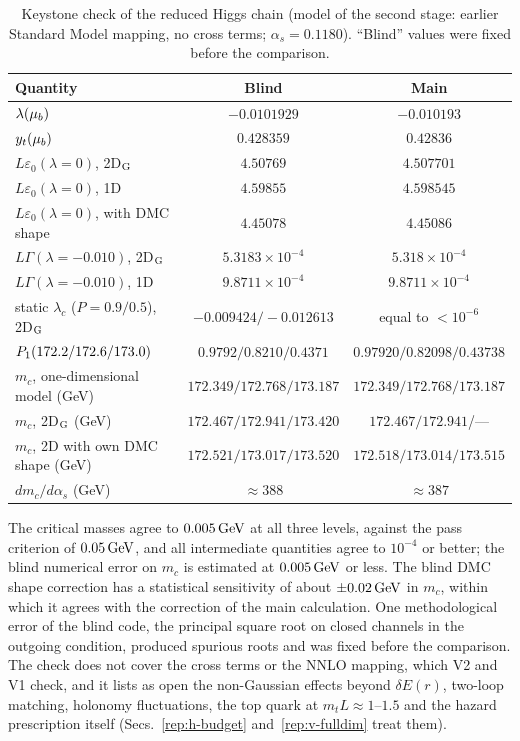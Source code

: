 \begin{table}[t]
\centering
\caption{Keystone check of the reduced Higgs chain (model of the second stage: earlier Standard Model mapping, no cross terms; $\alpha_s=0.1180$). ``Blind'' values were fixed before the comparison.}
\label{tab:v19-keystone}
\small
\begin{tabular}{@{}lcc@{}}
\toprule
Quantity & Blind & Main \\
\midrule
$\lambda(\mu_b)$ & $-0.0101929$ & $-0.010193$ \\ %
$y_t(\mu_b)$ & $0.428359$ & $0.42836$ \\ %
$L\varepsilon_0(\lambda=0)$, 2D$_{\rm G}$ & $4.50769$ & $4.507701$ \\ %
$L\varepsilon_0(\lambda=0)$, 1D & $4.59855$ & $4.598545$ \\ %
$L\varepsilon_0(\lambda=0)$, with DMC shape & $4.45078$ & $4.45086$ \\ %
$L\Gamma(\lambda=-0.010)$, 2D$_{\rm G}$ & $5.3183\times10^{-4}$ & $5.318\times10^{-4}$ \\ %
$L\Gamma(\lambda=-0.010)$, 1D & $9.8711\times10^{-4}$ & $9.8711\times10^{-4}$ \\ %
static $\lambda_c$ ($P=0.9/\allowbreak 0.5$), 2D$_{\rm G}$ & $-0.009424/\allowbreak{-}0.012613$ & equal to $<10^{-6}$ \\ %
$P_1(172.2/\allowbreak 172.6/\allowbreak 173.0)$ & $0.9792/\allowbreak 0.8210/\allowbreak 0.4371$ & $0.97920/\allowbreak 0.82098/\allowbreak 0.43738$ \\ %
$m_c$, one-dimensional model (GeV) & $172.349/\allowbreak 172.768/\allowbreak 173.187$ & $172.349/\allowbreak 172.768/\allowbreak 173.187$ \\ %
$m_c$, 2D$_{\rm G}$ (GeV) & $172.467/\allowbreak 172.941/\allowbreak 173.420$ & $172.467/\allowbreak 172.941$/--- \\ %
$m_c$, 2D with own DMC shape (GeV) & $172.521/\allowbreak 173.017/\allowbreak 173.520$ & $172.518/\allowbreak 173.014/\allowbreak 173.515$ \\ %
$dm_c/d\alpha_s$ (GeV) & $\approx388$ & $\approx387$ \\ %
\bottomrule
\end{tabular}
\end{table}

The critical masses agree to $0.005\,\mathrm{GeV}$ at all three levels, against the pass criterion of $0.05\,\mathrm{GeV}$, and all intermediate quantities agree to $10^{-4}$ or better; the blind numerical error on $m_c$ is estimated at $0.005\,\mathrm{GeV}$ or less. %
The blind DMC shape correction has a statistical sensitivity of about $\pm0.02\,\mathrm{GeV}$ in $m_c$, within which it agrees with the correction of the main calculation.
One methodological error of the blind code, the principal square root on closed channels in the outgoing condition, produced spurious roots and was fixed before the comparison.
The check does not cover the cross terms or the NNLO mapping, which V2 and V1 check, and it lists as open the non-Gaussian effects beyond $\delta E(r)$, two-loop matching, holonomy fluctuations, the top quark at $m_tL\approx1$--$1.5$ and the hazard prescription itself (Secs.~\ref{rep:h-budget} and~\ref{rep:v-fulldim} treat them). %

